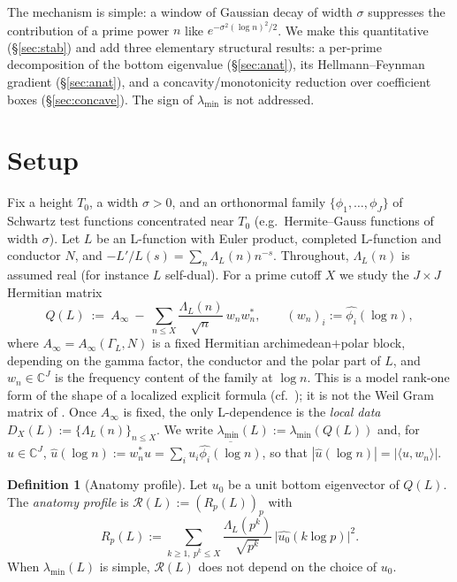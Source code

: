 \documentclass[11pt]{amsart}
\theoremstyle{definition}
\newtheorem{definition}[theorem]{Definition}
\theoremstyle{remark}
\newcommand{\lmin}{\lambda_{\min}}
\newcommand{\Rprof}{\mathcal R}
\begin{document}
The mechanism is simple: a window of Gaussian decay of width $\sigma$ suppresses the contribution of a prime
power $n$ like $e^{-\sigma^2(\log n)^2/2}$. We make this quantitative (\S\ref{sec:stab}) and add three
elementary structural results: a per-prime decomposition of the bottom eigenvalue (\S\ref{sec:anat}), its
Hellmann--Feynman gradient (\S\ref{sec:anat}), and a concavity/monotonicity reduction over coefficient boxes
(\S\ref{sec:concave}). The sign of $\lmin$ is not addressed.

\section{Setup}\label{sec:setup}
Fix a height $T_0$, a width $\sigma>0$, and an orthonormal family $\{\phi_1,\dots,\phi_J\}$ of Schwartz
test functions concentrated near $T_0$ (e.g.\ Hermite--Gauss functions of width $\sigma$). Let $L$ be an
L-function with Euler product, completed L-function and conductor $N$, and $-L'/L(s)=\sum_n\Lambda_L(n)n^{-s}$.
Throughout, $\Lambda_L(n)$ is assumed real (for instance $L$ self-dual). For a prime cutoff $X$ we study the
$J\times J$ Hermitian matrix
\begin{equation}\label{eq:Q}
Q(L)\ :=\ A_\infty\ -\ \sum_{n\le X}\frac{\Lambda_L(n)}{\sqrt n}\,w_nw_n^{*},\qquad (w_n)_i:=\widehat{\phi_i}(\log n),
\end{equation}
where $A_\infty=A_\infty(\Gamma_L,N)$ is a fixed Hermitian archimedean$+$polar block, depending on the
gamma factor, the conductor and the polar part of $L$, and $w_n\in\mathbb C^J$ is the frequency content of
the family at $\log n$. This is a model rank-one form of the shape of a localized explicit formula
(cf.\ \cite[Thm.~5.12]{bgIK}); it is not the Weil Gram matrix of \cite{P7}. Once $A_\infty$ is fixed, the
only L-dependence is the \emph{local data} $D_X(L):=\{\Lambda_L(n)\}_{n\le X}$. We write $\lmin(L):=\lmin(Q(L))$
and, for $u\in\mathbb C^J$, $\widehat u(\log n):=w_n^*u=\sum_i u_i\overline{\widehat{\phi_i}(\log n)}$, so that
$|\widehat u(\log n)|=|\langle u,w_n\rangle|$.

\begin{definition}[Anatomy profile]\label{def:profile}
Let $u_0$ be a unit bottom eigenvector of $Q(L)$. The \emph{anatomy profile} is $\Rprof(L):=(R_p(L))_p$ with
\[
R_p(L):=\sum_{k\ge1,\ p^k\le X}\frac{\Lambda_L(p^k)}{\sqrt{p^k}}\,\big|\widehat{u_0}(k\log p)\big|^2 .
\]
When $\lmin(L)$ is simple, $\Rprof(L)$ does not depend on the choice of $u_0$.
\end{definition}
\end{document}
